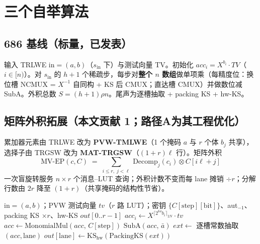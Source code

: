 \documentclass[11pt]{article}
\begin{document}
\section{三个自举算法}

\subsection{686 基线（标量，已发表）}

输入 TRLWE $\mathrm{in}=(a,b)$（$s_{\mathrm{in}}$ 下）与测试向量 TV。初始化 $acc_i = X^{b_i}\!\cdot\!TV$（$i\in[n)$）。对 $s_{\mathrm{in}}$ 的 $h{+}1$ 个稀疏步，每步对\textbf{整个 $n$ 数组}做单项乘（每精度位：换位槽 NCMUX = $X^{-1}$ 自同构 + KS 后 CMUX；直达槽 CMUX）并做数位减 SubA。外积总数 $S=(h{+}1)\rho n$。尾声为逐槽抽取 + packing KS + hw-KS。

\subsection{矩阵外积拓展（本文贡献 1；路径A为其工程优化）}

累加器元素由 TRLWE 改为 \textbf{PVW-TMLWE}（1 个掩码 $a$ 与 $r$ 个体 $b_j$ 共享），选择子由 TRGSW 改为 \textbf{MAT-TRGSW}（$(1{+}r)\ell$ 行）。矩阵外积
\[
\mathrm{MV\text{-}EP}(c,C)\;=\;\sum_{i\le r,\; j<\ell}\ \mathrm{Decomp}_j(c_i)\otimes C[i\ell+j]
\]
一次盲旋转服务 $n\times r$ 个消息--LUT 查询；外积计数不变而每 lane 摊销 $\div r$；分解行数由 $2r$ 降至 $(1{+}r)$（共享掩码的结构性节省）。

\begin{algorithm}[htbp]
\caption{矩阵形式摊销稀疏自举（外层）}
\label{alg:mat}
\begin{algorithmic}[1]
\Require $\mathrm{in}=(a,b)$；PVW 测试向量 $\mathit{tv}$（$r$ 路 LUT）；密钥 $\{C[\text{step}][\text{bit}]\}$、aut$_{-1}$、packing KS $\times r$、hw-KS
\Ensure $out[0..r{-}1]$
\For{$i\in[0,n)$} $acc_i \leftarrow X^{\lceil 2^{64} b_i\rceil_{2N}}\cdot \mathit{tv}$ \EndFor
{}
  \State $acc \leftarrow \mathrm{MonomialMul}(acc,\,C[\text{step}])$ 
  \State $\mathrm{SubA}(acc,\,\bar a)$ 
\EndFor
\For{$\text{lane}\in[0,r)$}
  \State $ext \leftarrow$ 逐槽常数抽取$(acc,\text{lane})$
  \State $out[\text{lane}] \leftarrow \mathrm{KS}_{\mathrm{hw}}(\mathrm{PackingKS}(ext))$
\EndFor
\end{algorithmic}
\end{algorithm}
\end{document}
